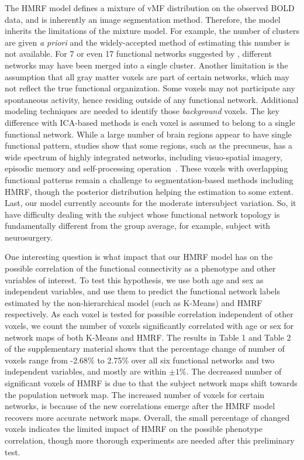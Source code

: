 \documentclass[review,authoryear]{elsarticle}
\begin{document}
The HMRF model defines a mixture of vMF distribution on the observed BOLD data,
and is inherently an image segmentation method. Therefore, the model inherits
the limitations of the mixture model. For example, the number of clusters are
given \emph{a priori} and the widely-accepted method of estimating this number
is not available. For 7 or even 17 functional networks suggested by
\citet{yeo2011organization}, different networks may have been merged into a
single cluster. Another limitation is the assumption that all gray matter voxels
are part of certain networks, which may not reflect the true functional
organization. Some voxels may not participate any spontaneous activity, hence
residing outside of any functional network. Additional modeling techniques are
needed to identify those \emph{background} voxels. The key difference with
ICA-based methods is each voxel is assumed to belong to a single functional
network. While a large number of brain regions appear to have single functional
pattern, studies show that some regions, such as the precuneus, has a wide
spectrum of highly integrated networks, including visuo-spatial imagery,
episodic memory and self-processing operation~\cite{cavanna2006precuneus}. These
voxels with overlapping functional patterns remain a challenge to
segmentation-based methods including HMRF, though the posterior distribution
helping the estimation to some extent. Last, our model currently accounts for
the moderate intersubject variation. So, it have difficulty dealing with the
subject whose functional network topology is fundamentally different from the
group average, for example, subject with neurosurgery.

One interesting question is what impact that our HMRF model has on the possible
correlation of the functional connectivity as a phenotype and other variables of
interest. To test this hypothesis, we use both age and sex as independent
variables, and use them to predict the functional network labels estimated by
the non-hierarchical model (such as K-Means) and HMRF respectively. As each
voxel is tested for possible correlation independent of other voxels, we count
the number of voxels significantly correlated with age or sex for network maps
of both K-Means and HMRF. The results in Table 1 and Table 2 of the
supplementary material shows that the percentage change of number of voxels
range from -2.68\% to 2.75\% over all six functional networks and two
independent variables, and mostly are within $\pm 1\%$. The decreased number of
significant voxels of HMRF is due to that the subject network maps shift towards
the population network map. The increased number of voxels for certain networks,
is because of the new correlations emerge after the HMRF model recovers more
accurate network maps. Overall, the small percentage of changed voxels indicates
the limited impact of HMRF on the possible phenotype correlation, though more
thorough experiments are needed after this preliminary test.
\end{document}
